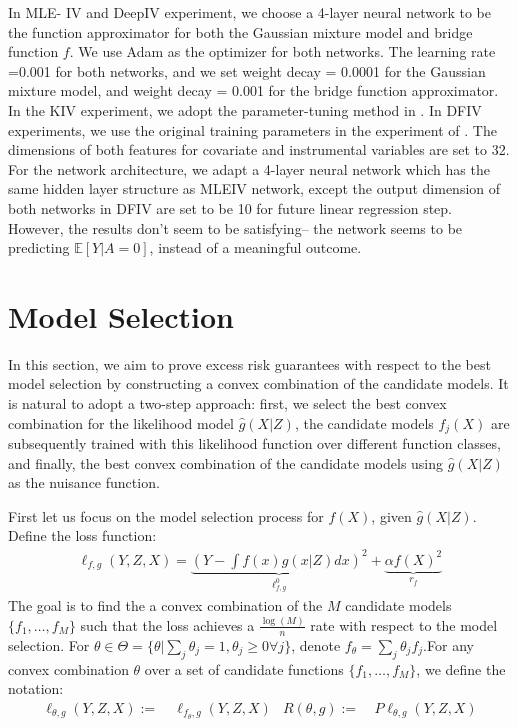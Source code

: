 \documentclass[12pt]{extarticle} %
\newcommand{\E}{\mathbb{E}}
\begin{document}
In MLE- IV and DeepIV experiment, we choose a 4-layer neural network to be the function approximator for both the Gaussian mixture model and bridge function $f$. We use Adam as the optimizer for both networks. The learning rate =0.001 for both networks, and we set weight decay = 0.0001 for the Gaussian mixture model, and weight decay = 0.001 for the bridge function approximator.
In the KIV experiment, we adopt the parameter-tuning method in \cite{singh2019kernel}. In DFIV experiments, we use the original training parameters in the experiment of \cite{xu2020learning}. The dimensions of both features for covariate and instrumental variables are set to 32. For the network architecture, we adapt a 4-layer neural network which has the same hidden layer structure as MLEIV network, except the output dimension of both networks in DFIV are set to be 10 for future linear regression step. However, the results don't seem to be satisfying-- the network seems to be predicting $\E[Y|A = 0]$, instead of a meaningful outcome.

\section{Model Selection}
In this section, we aim to prove excess risk guarantees with respect to the best model selection by constructing a convex combination of the candidate models. It is natural to adopt a two-step approach: first, we select the best convex combination for the likelihood model $\hat{g}(X|Z)$, the candidate models $f_j(X)$ are subsequently trained with this likelihood function over different function classes, and finally, the best convex combination of the candidate models using $\hat{g}(X|Z)$ as the nuisance function.

First let us focus on the model selection process for $f(X)$, given $\hat{g}(X|Z)$. 
Define the loss function:
\begin{align}
    \ell_{f,g}(Y,Z,X) = \underbrace{\left(Y - \int f(x)g(x|Z)dx\right)^2}_{\ell^{0}_{f,g}} + \underbrace{\alpha f(X)^2}_{r_f} \label{Eqn:q_agg_loss}
\end{align}
The goal is to find the a convex combination of the $M$ candidate models $\{f_1, \dots, f_M\}$ such that the loss achieves a $\frac{\log(M)}{n}$ rate with respect to the model selection. For $\theta\in\Theta = \{\theta | \sum_j \theta_j = 1, \theta_j\geq 0 \forall j\} $, denote $f_{\theta} = \sum_j \theta_j f_j$.For any convex combination $\theta$ over a set of candidate functions $\{f_1, \ldots, f_M\}$, we define the notation:
\begin{align}
    \ell_{\theta,g}(Y,Z,X) :=~& \ell_{f_{\theta}, g}(Y,Z,X) &
    R(\theta,g) :=~& P\ell_{\theta,g}(Y,Z,X)
\end{align}
\end{document}
